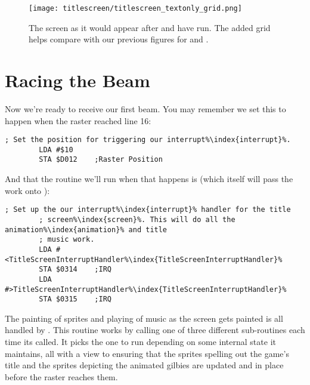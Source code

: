 \begin{figure}[H]
    \begin{adjustbox}{width=13cm,center}
    \texttt{[image: titlescreen/titlescreen\_textonly\_grid.png]}%
    \end{adjustbox}
  \caption{The screen as it would appear after  and  have run. The added
  grid helps compare with our previous figures for  and .}
\end{figure}

\section{Racing the Beam}
Now we're ready to receive our first beam. You may remember we set this to happen when the raster reached line 16:

\begin{lstlisting}[caption=In \icode{InitializeSpritesAndInterruptsForTitleScreen\index{InitializeSpritesAndInterruptsForTitleScreen}},escapechar=\%]
        ; Set the position for triggering our interrupt%\index{interrupt}%.
        LDA #$10
        STA $D012    ;Raster Position
\end{lstlisting}

And that the routine we'll run when that happens is  (which itself will pass
the work onto ):

\begin{lstlisting}[caption=In \icode{InitializeSpritesAndInterruptsForTitleScreen\index{InitializeSpritesAndInterruptsForTitleScreen}},escapechar=\%]
        ; Set up the our interrupt%\index{interrupt}% handler for the title
        ; screen%\index{screen}%. This will do all the animation%\index{animation}% and title
        ; music work.
        LDA #<TitleScreenInterruptHandler%\index{TitleScreenInterruptHandler}%
        STA $0314    ;IRQ
        LDA #>TitleScreenInterruptHandler%\index{TitleScreenInterruptHandler}%
        STA $0315    ;IRQ
\end{lstlisting}

The painting of sprites and playing of music as the screen gets painted is all handled by .
This routine works by calling one of three different sub-routines each time its called. It picks the one to run
depending on some internal state it maintains, all with a view to ensuring that the sprites spelling out the game's
title and the sprites depicting the animated gilbies are updated and in place before the raster reaches them.

